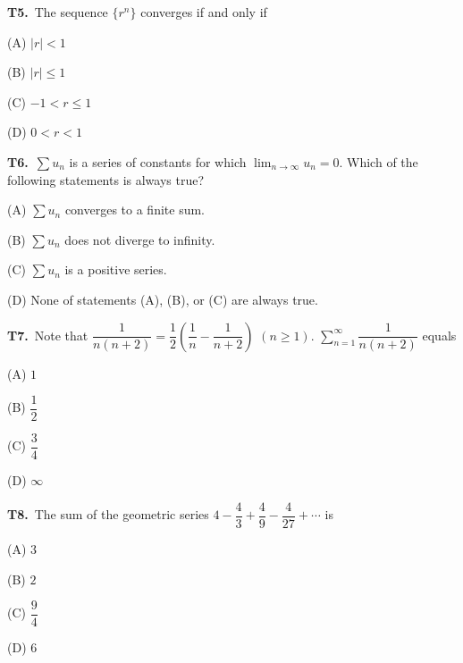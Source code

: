 \documentclass[11pt]{article}
\begin{document}
\bigskip\noindent\textbf{T5.}\ The sequence $\{r^n\}$ converges if and only if
\begin{list}{}{\setlength{\leftmargin}{3em}\setlength{\labelwidth}{2.5em}\setlength{\itemsep}{0pt}\setlength{\topsep}{2pt}}
\item[(A)] $|r|<1$
\item[(B)] $|r|\leq 1$
\item[(C)] $-1<r\leq 1$
\item[(D)] $0<r<1$
\end{list}

\bigskip\noindent\textbf{T6.}\ $\displaystyle\sum u_n$ is a series of constants for which $\displaystyle\lim_{n\to\infty} u_n=0$. Which of the following statements is always true?
\begin{list}{}{\setlength{\leftmargin}{3em}\setlength{\labelwidth}{2.5em}\setlength{\itemsep}{0pt}\setlength{\topsep}{2pt}}
\item[(A)] $\displaystyle\sum u_n$ converges to a finite sum.
\item[(B)] $\displaystyle\sum u_n$ does not diverge to infinity.
\item[(C)] $\displaystyle\sum u_n$ is a positive series.
\item[(D)] None of statements (A), (B), or (C) are always true.
\end{list}

\bigskip\noindent\textbf{T7.}\ Note that $\dfrac{1}{n(n+2)}=\dfrac{1}{2}\left(\dfrac{1}{n}-\dfrac{1}{n+2}\right)$ $(n\geq 1)$. $\displaystyle\sum_{n=1}^\infty \dfrac{1}{n(n+2)}$ equals
\begin{list}{}{\setlength{\leftmargin}{3em}\setlength{\labelwidth}{2.5em}\setlength{\itemsep}{0pt}\setlength{\topsep}{2pt}}
\item[(A)] $1$
\item[(B)] $\dfrac{1}{2}$
\item[(C)] $\dfrac{3}{4}$
\item[(D)] $\infty$
\end{list}

\bigskip\noindent\textbf{T8.}\ The sum of the geometric series $4-\dfrac{4}{3}+\dfrac{4}{9}-\dfrac{4}{27}+\cdots$ is
\begin{list}{}{\setlength{\leftmargin}{3em}\setlength{\labelwidth}{2.5em}\setlength{\itemsep}{0pt}\setlength{\topsep}{2pt}}
\item[(A)] $3$
\item[(B)] $2$
\item[(C)] $\dfrac{9}{4}$
\item[(D)] $6$
\end{list}
\end{document}
